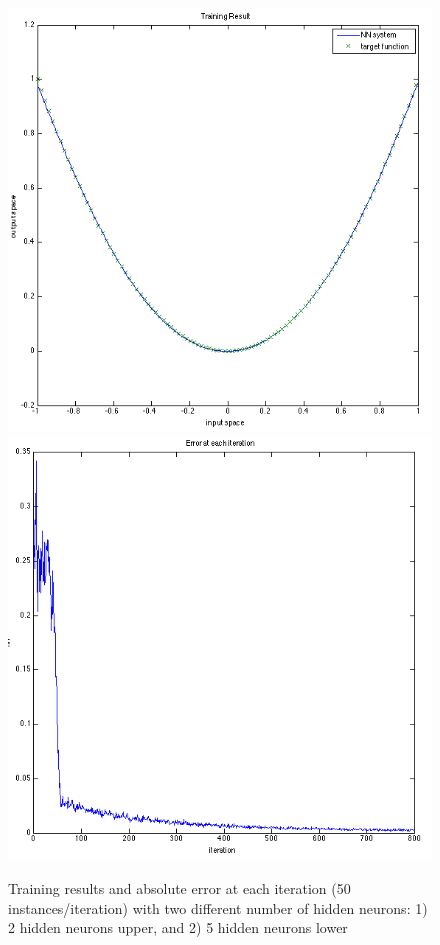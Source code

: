 \documentclass[12pt]{article}
\begin{document}
\begin{figure}[ht]
	\vspace*{-2.2em}
	\includegraphics[scale=.45]{../res/result_quadratic_nN5.png}
	\hspace*{.5em}
	\includegraphics[scale=.45]{../res/absErr_quadratic_nN5.png}
	\caption{Training results and absolute error at each iteration (50 instances/iteration) with two different number of hidden neurons: 1) 2 hidden neurons upper, and 2) 5 hidden neurons lower}
\end{figure}
\end{document}
